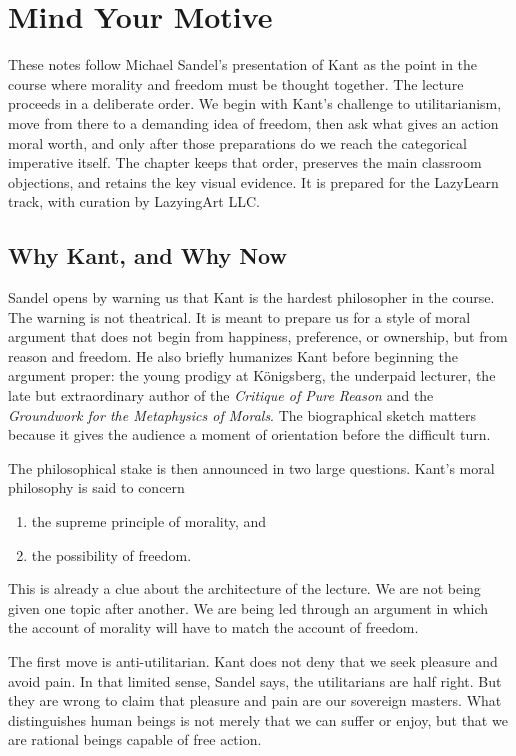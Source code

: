 \chapter{Mind Your Motive}

These notes follow Michael Sandel's presentation of Kant as the point in the course where morality and freedom must be thought together. The lecture proceeds in a deliberate order. We begin with Kant's challenge to utilitarianism, move from there to a demanding idea of freedom, then ask what gives an action moral worth, and only after those preparations do we reach the categorical imperative itself. The chapter keeps that order, preserves the main classroom objections, and retains the key visual evidence. It is prepared for the LazyLearn track, with curation by LazyingArt LLC.

\section{Why Kant, and Why Now}

Sandel opens by warning us that Kant is the hardest philosopher in the course. The warning is not theatrical. It is meant to prepare us for a style of moral argument that does not begin from happiness, preference, or ownership, but from reason and freedom. He also briefly humanizes Kant before beginning the argument proper: the young prodigy at K\"onigsberg, the underpaid lecturer, the late but extraordinary author of the \emph{Critique of Pure Reason} and the \emph{Groundwork for the Metaphysics of Morals}. The biographical sketch matters because it gives the audience a moment of orientation before the difficult turn.

The philosophical stake is then announced in two large questions. Kant's moral philosophy is said to concern
\begin{enumerate}
\item the supreme principle of morality, and
\item the possibility of freedom.
\end{enumerate}
This is already a clue about the architecture of the lecture. We are not being given one topic after another. We are being led through an argument in which the account of morality will have to match the account of freedom.

The first move is anti-utilitarian. Kant does not deny that we seek pleasure and avoid pain. In that limited sense, Sandel says, the utilitarians are half right. But they are wrong to claim that pleasure and pain are our sovereign masters. What distinguishes human beings is not merely that we can suffer or enjoy, but that we are rational beings capable of free action.

